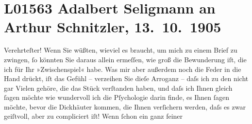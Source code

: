 

\section[Adalbert Seligmann an Arthur Schnitzler, 13. 10. 1905]{L01563 Adalbert Seligmann an Arthur Schnitzler, 13. 10. 1905}
\nopagebreak{}
\rehead{ }\normalsize\beginnumbering{}
\toendnotes[C]{\smallbreak\pagebreak[2]}
\toendnotes[C]{\smallbreak}
\toendnotes[C]{\smallbreak}
\pstart
           \noindent{}{\pb}Verehrteſter! Wenn Sie wüßten, wieviel es
               braucht, um mich zu einem Brief zu zwingen,{ }ſo könnten Sie daraus allein ermeſſen,
               wie groß die Bewunderung iſt, die ich für Ihr »Zwischenspiel« habe. Was mir aber außerdem noch die Feder in die Hand
               drückt, iſt das Gefühl – verzeihen Sie dieſe Arroganz – daſs ich zu den nicht gar
               Vielen gehöre, die das Stück verſtanden haben, und
               daſs ich Ihnen gleich{ }ſagen möchte wie wundervoll ich die Pſychologie darin finde, es
               Ihnen{ }ſagen möchte, bevor die Dickhäuter kommen, die Ihnen verſichern werden, daſs es
               zwar {\pb}geiſtvoll, aber zu compliciert iſt! Wenn{ }ſchon ein ganz feiner
